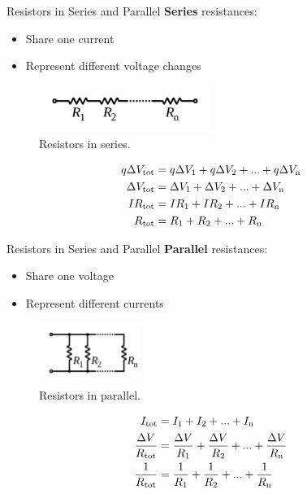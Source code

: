 \documentclass{beamer}
\begin{document}
\begin{frame}{Resistors in Series and Parallel}
\footnotesize
\textbf{\alert{Series}} resistances:
\begin{itemize}
\item Share one current
\item Represent different voltage changes
\end{itemize}
\begin{figure}
\centering
\includegraphics[width=0.5\textwidth]{figures/series_resist.png}
\caption{\label{fig:series} Resistors in series.}
\end{figure}
\begin{align}
q\Delta V_{\rm tot} &= q\Delta V_{\rm 1} + q\Delta V_{\rm 2} + ... + q\Delta V_{\rm n} \\
\Delta V_{\rm tot} &= \Delta V_{\rm 1} + \Delta V_{\rm 2} + ... + \Delta V_{\rm n} \\
I R_{\rm tot} &= I R_{\rm 1} + I R_{\rm 2} + ... + I R_{\rm n} \\
R_{\rm tot} &= R_{\rm 1} + R_{\rm 2} + ... + R_{\rm n}
\end{align}
\end{frame}

\begin{frame}{Resistors in Series and Parallel}
\footnotesize
\textbf{\alert{Parallel}} resistances:
\begin{itemize}
\item Share one voltage
\item Represent different currents
\end{itemize}
\begin{figure}
\centering
\includegraphics[width=0.3\textwidth]{figures/parallel_resist.png}
\caption{\label{fig:parallel} Resistors in parallel.}
\end{figure}
\begin{align}
I_{\rm tot} &= I_{\rm 1} + I_{\rm 2} + ... + I_{\rm n} \\
\frac{\Delta V}{R_{\rm tot}} &= \frac{\Delta V}{R_{\rm 1}} + \frac{\Delta V}{R_{\rm 2}} + ... + \frac{\Delta V}{R_{\rm n}} \\
\frac{1}{R_{\rm tot}} &= \frac{1}{R_{\rm 1}} + \frac{1}{R_{\rm 2}} + ... + \frac{1}{R_{\rm n}}
\end{align}
\end{frame}
\end{document}
